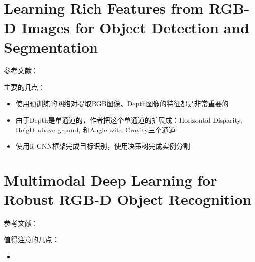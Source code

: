 \section{Learning Rich Features from RGB-D Images for Object Detection and Segmentation}

参考文献：\cite{gupta2014learning}

主要的几点：

\begin{itemize}
\item 使用预训练的网络对提取RGB图像、Depth图像的特征都是非常重要的
\item 由于Depth是单通道的，作者把这个单通道的扩展成：Horizontal Disparity, Height above ground, 和Angle with Gravity三个通道
\item 使用R-CNN框架完成目标识别，使用决策树完成实例分割
\end{itemize}

\section{Multimodal Deep Learning for Robust RGB-D Object Recognition}

参考文献：\cite{eitel2015multimodal}

值得注意的几点：

\begin{itemize}
\item 
\end{itemize}
















